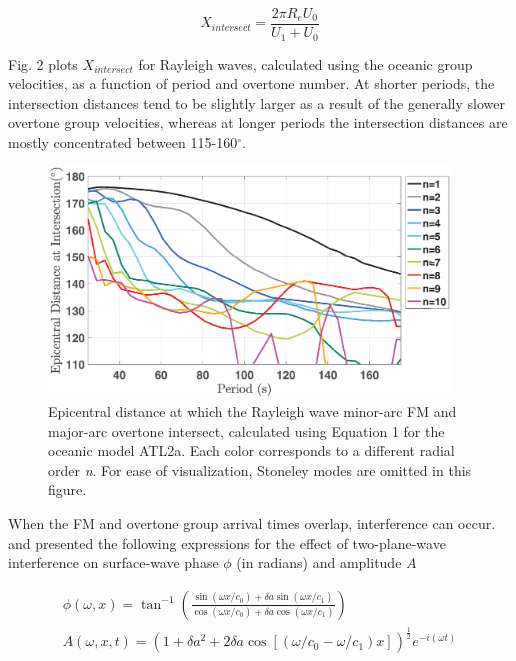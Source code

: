 \documentclass[extra,mreferee]{gji}
\begin{document}
\begin{equation}
X_{intersect} = \frac{2 \pi R_e U_{0}}{U_1 + U_{0}}
\end{equation}
     
Fig. 2 plots $X_{intersect}$ for Rayleigh waves, calculated using the oceanic group velocities, as a function of period and overtone number. At shorter periods, the intersection distances tend to be slightly larger as a result of the generally slower overtone group velocities, whereas at longer periods the intersection distances are mostly concentrated between 115-160$^\circ$. 
       
\begin{figure}
\centering
\includegraphics[width=0.95\textwidth]{Fig2.eps}
\caption{Epicentral distance at which the Rayleigh wave minor-arc FM and major-arc overtone intersect, calculated using Equation 1 for the oceanic model ATL2a. Each color corresponds to a different radial order \textit{n}. For ease of visualization, Stoneley modes are omitted in this figure. }
\end{figure}

When the FM and overtone group arrival times overlap, interference can occur. \citet{forsyth1975new} and \citet{thatcher1969higher} presented the following expressions for the effect of two-plane-wave interference on surface-wave phase $\phi$ (in radians) and amplitude $A$

\begin{subequations} 
\begin{align} 
\phi(\omega, x) = \tan^{-1} \left(\frac{\sin(\omega x/c_0) + \delta a \sin(\omega x/c_1) }{\cos(\omega x/c_0) + \delta a \cos(\omega x/c_1)} \right) \label{eqn: frobenius 7} \\ 
A(\omega, x,t) = (1 + \delta a^2 + 2 \delta a \cos[( \omega/c_0 - \omega/c_1)x])^{\frac{1}{2}} e^{-i ( \omega t)} \label{eqn: frobenius 8} 
\end{align} \end{subequations}
\end{document}
